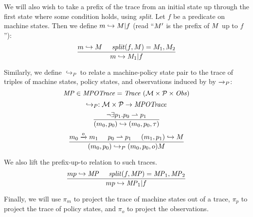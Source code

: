 \documentclass[acmsmall,review,anonymous]{acmart}\settopmatter{printfolios=true,printccs=false,printacmref=false}
\begin{document}
We will also wish to take a prefix of the trace from an initial state up through the first state where
some condition holds, using {\it split}. Let \(f\) be a predicate on machine states. Then we define
\(m \hookrightarrow M | f\) (read ``\(M'\) is the prefix of \(M\) up to \(f\)''):
  \[\frac{m \hookrightarrow M \hspace{.5cm} \mathit{split}(f,M) = M_1,M_2}
         {m \hookrightarrow M_1 | f}\]

Similarly, we define \(\hookrightarrow_P\) to relate a machine-policy
state pair to the trace of triples of machine states, policy states,
and observations induced by by \(\xrightarrow{}_P\):
%
  \[\MPT \in \mathit{MPOTrace} = \mathit{Trace}\ (\MACHS \times \POLS \times \OBSS)\]
  \[\hookrightarrow_P : {\mathcal M} \times \mathcal{P} \rightarrow \mathit{MPOTrace}\]
  \[\frac{\neg \exists p_1 . p_0 \rightharpoonup p_1}
         {(m_0,p_0) \hookrightarrow (m_0,p_0,\tau)}\]
  \[\frac{m_0 \xrightarrow{o} m_1 \hspace{.5cm} p_0 \rightharpoonup p_1 \hspace{.5cm}
            (m_1,p_1) \hookrightarrow M}
         {(m_0,p_0) \hookrightarrow_P (m_0,p_0,o) M}\]

We also lift the prefix-up-to relation to such traces.
  \[\frac{mp \hookrightarrow \mathit{MP} \hspace{.5cm} \mathit{split}(f,\mathit{MP}) = \mathit{MP}_1,\mathit{MP}_2}
         {mp \hookrightarrow \mathit{MP}_1 | f}\]

Finally, we will use \(\pi_m\) to project the trace of machine states
out of a trace, \(\pi_p\) to project the trace of policy states, and
\(\pi_o\) to project the observations.
       
\end{document}

